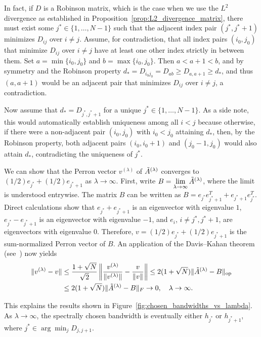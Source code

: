 In fact, if $D$ is a Robinson matrix, which is the case when we use the $L^2$ divergence as established in Proposition~\ref{prop:L2_divergence_matrix}, there must exist some $j^{\ast}\in\{1,\dots,N-1\}$ such that the adjacent index pair $(j^{\ast},j^{\ast}+1)$ minimizes $D_{ij}$ over $i\ne j$. Assume, for contradiction, that all index pairs $(i_0,j_0)$ that minimize $D_{ij}$ over $i\ne j$ have at least one other index strictly in between them. Set $a=\min\{i_0,j_0\}$ and $b=\max\{i_0,j_0\}$. Then $a<a+1<b$, and by symmetry and the Robinson property $d_{\ast}=D_{i_0j_0}=D_{ab}\ge D_{a,a+1}\ge d_{\ast}$, and thus $(a,a+1)$ would be an adjacent pair that minimizes $D_{ij}$ over $i\ne j$, a contradiction.

Now assume that $d_{\ast}=D_{j^{\ast},j^{\ast}+1}$ for a unique $j^{\ast}\in\{1,\dots,N-1\}$. As a side note, this would automatically establish uniqueness among all $i<j$ because otherwise, if there were a non-adjacent pair $(i_0,j_0)$ with $i_0<j_0$ attaining $d_{\ast}$, then, by the Robinson property, both adjacent pairs $(i_0,i_0+1)$ and $(j_0-1,j_0)$ would also attain $d_{\ast}$, contradicting the uniqueness of $j^{\ast}$.

We can show that the Perron vector $v^{(\lambda)}$ of $\Tilde{A}^{(\lambda)}$ converges to $(1/2)e_{j^{\ast}}+(1/2)e_{j^{\ast}+1}$ as $\lambda\to\infty$. First, write $B=\lim\limits_{\lambda\to\infty}\Tilde{A}^{(\lambda)}$, where the limit is understood entrywise. The matrix $B$ can be written as $B=e_{j^{\ast}}e_{j^{\ast}+1}^{T}+e_{j^{\ast}+1}e_{j^{\ast}}^{T}$. Direct calculations show that $e_{j^{\ast}}+e_{j^{\ast}+1}$ is an eigenvector with eigenvalue $1$, $e_{j^{\ast}}-e_{j^{\ast}+1}$ is an eigenvector with eigenvalue $-1$, and $e_i$, $i\ne j^{\ast},j^{\ast}+1$, are eigenvectors with eigenvalue $0$. Therefore, $v=(1/2)e_{j^{\ast}}+(1/2)e_{j^{\ast}+1}$ is the sum-normalized Perron vector of $B$. An application of the Davis--Kahan theorem (see~\cite[Corollary~1]{yu_useful_2015}) now yields
\begin{align*}
    \|v^{(\lambda)}-v\|&\le\frac{1+\sqrt{N}}{\sqrt{2}}\left\|\frac{v^{(\lambda)}}{\|v^{(\lambda)}\|}-\frac{v}{\|v\|}\right\|\le2(1+\sqrt{N})\|\Tilde{A}^{(\lambda)}-B\|_{\operatorname{op}}\\&\le2(1+\sqrt{N})\|\Tilde{A}^{(\lambda)}-B\|_F\to0,\quad\lambda\to\infty.
\end{align*}

This explains the results shown in Figure~\ref{fig:chosen_bandwidths_vs_lambda}. As $\lambda\to\infty$, the spectrally chosen bandwidth is eventually either $h_{j^{\ast}}$ or $h_{j^{\ast}+1}$, where $j^{\ast}\in\arg\min_jD_{j,j+1}$.

